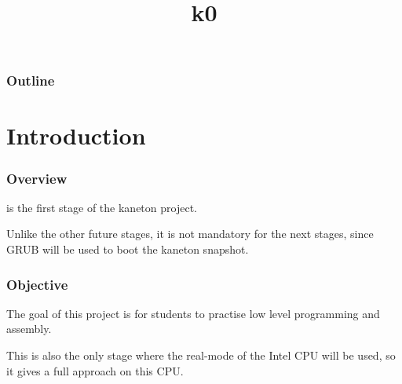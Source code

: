 %
%
%
%
%
%

%
%

%
%

\def\path{../../..}

%
%



%
%

\title{k0}

%
%



%
%

\begin{frame}
  \titlepage
\end{frame}

%
%

\begin{frame}
  \frametitle{Outline}

  \tableofcontents
\end{frame}

%
%

%
%

\section{Introduction}


\begin{frame}
  \frametitle{Overview}

   is the first stage of the kaneton project.

  \-

  Unlike the other future stages, it is not mandatory for the next stages, since GRUB will be used to boot the kaneton snapshot.

\end{frame}


\begin{frame}
  \frametitle{Objective}

  The goal of this project is for students to practise low level programming and assembly.

  \-

  This is also the only stage where the real-mode of the Intel CPU will be used, so it gives a full approach on this CPU.

\end{frame}

